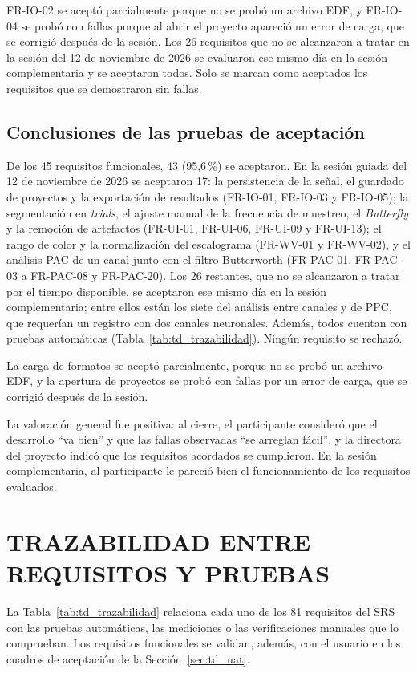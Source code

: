\documentclass[12pt,letterpaper,oneside]{article}
\DeclareRobustCommand{\_}{\textunderscore\allowbreak}
\newcommand{\fechasesion}{12 de noviembre de 2026}
\newcommand{\capitulo}[1]{\clearpage\section{#1}}
\begin{document}
FR-IO-02 se aceptó parcialmente porque no se probó un archivo EDF, y FR-IO-04 se probó con fallas porque al abrir el proyecto apareció un error de carga, que se corrigió después de la sesión. Los 26 requisitos que no se alcanzaron a tratar en la sesión del \fechasesion{} se evaluaron ese mismo día en la sesión complementaria y se aceptaron todos. Solo se marcan como aceptados los requisitos que se demostraron sin fallas.

\subsection{Conclusiones de las pruebas de aceptación}
De los 45 requisitos funcionales, 43 (95,6\,\%) se aceptaron. En la sesión guiada del \fechasesion{} se aceptaron 17: la persistencia de la señal, el guardado de proyectos y la exportación de resultados (FR-IO-01, FR-IO-03 y FR-IO-05); la segmentación en \textit{trials}, el ajuste manual de la frecuencia de muestreo, el \textit{Butterfly} y la remoción de artefactos (FR-UI-01, FR-UI-06, FR-UI-09 y FR-UI-13); el rango de color y la normalización del escalograma (FR-WV-01 y FR-WV-02), y el análisis PAC de un canal junto con el filtro Butterworth (FR-PAC-01, FR-PAC-03 a FR-PAC-08 y FR-PAC-20). Los 26 restantes, que no se alcanzaron a tratar por el tiempo disponible, se aceptaron ese mismo día en la sesión complementaria; entre ellos están los siete del análisis entre canales y de PPC, que requerían un registro con dos canales neuronales. Además, todos cuentan con pruebas automáticas (Tabla~\ref{tab:td_trazabilidad}). Ningún requisito se rechazó.

La carga de formatos se aceptó parcialmente, porque no se probó un archivo EDF, y la apertura de proyectos se probó con fallas por un error de carga, que se corrigió después de la sesión.

La valoración general fue positiva: al cierre, el participante consideró que el desarrollo ``va bien'' y que las fallas observadas ``se arreglan fácil'', y la directora del proyecto indicó que los requisitos acordados se cumplieron. En la sesión complementaria, al participante le pareció bien el funcionamiento de los requisitos evaluados.
\capitulo{TRAZABILIDAD ENTRE REQUISITOS Y PRUEBAS}
La Tabla~\ref{tab:td_trazabilidad} relaciona cada uno de los 81 requisitos del SRS con las pruebas automáticas, las mediciones o las verificaciones manuales que lo comprueban. Los requisitos funcionales se validan, además, con el usuario en los cuadros de aceptación de la Sección~\ref{sec:td_uat}.
\end{document}
